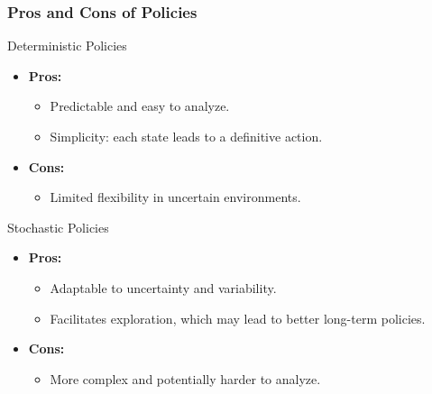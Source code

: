 \documentclass[aspectratio=169]{beamer}
\begin{document}
\begin{frame}[fragile]
    \frametitle{Pros and Cons of Policies}
    \begin{block}{Deterministic Policies}
        \begin{itemize}
            \item \textbf{Pros:}
            \begin{itemize}
                \item Predictable and easy to analyze.
                \item Simplicity: each state leads to a definitive action.
            \end{itemize}
            \item \textbf{Cons:}
            \begin{itemize}
                \item Limited flexibility in uncertain environments.
            \end{itemize}
        \end{itemize}
    \end{block}
    
    \begin{block}{Stochastic Policies}
        \begin{itemize}
            \item \textbf{Pros:}
            \begin{itemize}
                \item Adaptable to uncertainty and variability.
                \item Facilitates exploration, which may lead to better long-term policies.
            \end{itemize}
            \item \textbf{Cons:}
            \begin{itemize}
                \item More complex and potentially harder to analyze.
            \end{itemize}
        \end{itemize}
    \end{block}
\end{frame}
\end{document}
